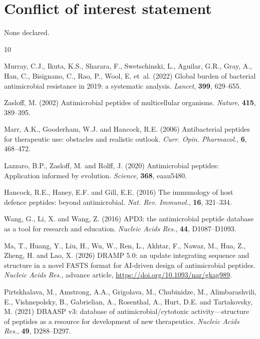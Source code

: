 \documentclass[unnumsec,webpdf,contemporary,large]{oup-authoring-template}%
\begin{document}
\section*{Conflict of interest statement}
None declared.

\begin{thebibliography}{10}

Murray, C.J., Ikuta, K.S., Sharara, F., Swetschinski, L., Aguilar, G.R., Gray, A., Han, C., Bisignano, C., Rao, P., Wool, E. et~al. (2022)
Global burden of bacterial antimicrobial resistance in 2019: a systematic analysis.
\newblock \emph{Lancet}, \textbf{399}, 629--655.

Zasloff, M. (2002)
Antimicrobial peptides of multicellular organisms.
\newblock \emph{Nature}, \textbf{415}, 389--395.

Marr, A.K., Gooderham, W.J. and Hancock, R.E. (2006)
Antibacterial peptides for therapeutic use: obstacles and realistic outlook.
\newblock \emph{Curr. Opin. Pharmacol.}, \textbf{6}, 468--472.

Lazzaro, B.P., Zasloff, M. and Rolff, J. (2020)
Antimicrobial peptides: Application informed by evolution.
\newblock \emph{Science}, \textbf{368}, eaau5480.

Hancock, R.E., Haney, E.F. and Gill, E.E. (2016)
The immunology of host defence peptides: beyond antimicrobial.
\newblock \emph{Nat. Rev. Immunol.}, \textbf{16}, 321--334.

Wang, G., Li, X. and Wang, Z. (2016)
APD3: the antimicrobial peptide database as a tool for research and education.
\newblock \emph{Nucleic Acids Res.}, \textbf{44}, D1087--D1093.

Ma, T., Huang, Y., Liu, H., Wu, W., Ren, L., Akhtar, F., Nawaz, M., Hua, Z., Zheng, H. and Lao, X. (2026)
DRAMP 5.0: an update integrating sequence and structure in a novel FASTS format for AI-driven design of antimicrobial peptides.
\newblock \emph{Nucleic Acids Res.}, advance article, \url{https://doi.org/10.1093/nar/gkag989}.

Pirtskhalava, M., Amstrong, A.A., Grigolava, M., Chubinidze, M., Alimbarashvili, E., Vishnepolsky, B., Gabrielian, A., Rosenthal, A., Hurt, D.E. and Tartakovsky, M. (2021)
DBAASP v3: database of antimicrobial/cytotoxic activity---structure of peptides as a resource for development of new therapeutics.
\newblock \emph{Nucleic Acids Res.}, \textbf{49}, D288--D297.


\end{thebibliography}
\end{document}
